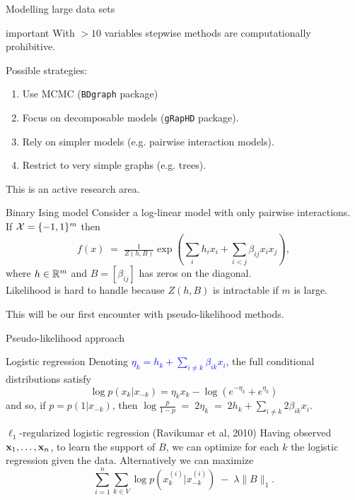 \documentclass[11pt,handout,aspectratio=169,dvipsnames]{beamer}
\begin{document}
\begin{frame}{Modelling large data sets}
		\begin{beamercolorbox}[wd=\paperwidth,sep=3pt]{important}
With $>10$ variables stepwise methods are computationally prohibitive. 
	\end{beamercolorbox}
	\bigskip
	
Possible strategies:\\[.3cm]
\begin{enumerate}
	\item Use MCMC (\texttt{BDgraph} package)
	\item Focus on \alert{decomposable models} (\texttt{gRapHD} package).\\[.3cm]
	\item Rely on simpler models (e.g. pairwise interaction models). \\[.3cm]
	\item Restrict to very simple graphs (e.g. trees).
\end{enumerate}
\bigskip

\alert{This is an active research area.}
\end{frame}



\begin{frame}{Binary Ising model}
	Consider a log-linear model with only pairwise interactions.\\[.3cm]
	If ${\cal X}=\{-1,1\}^m$ then $$f(x)\;=\;\tfrac{1}{Z(h,B)}\exp\left(\sum_i h_i x_i+\sum_{i<j}\beta_{ij}x_i x_j \right),$$
	where $h\in \mathbb R^m$ and $B=[\beta_{ij}]$ has zeros on the diagonal.\\[.3cm]
	Likelihood is hard to handle because $Z(h,B)$ is intractable if $m$ is large.\\
	\bigskip
	
	This will be our first encounter with pseudo-likelihood methods.
\end{frame}


\begin{frame}{Pseudo-likelihood approach}
\begin{block}{Logistic regression}
Denoting \textcolor{blue}{$\eta_k=h_k+\sum_{i\neq k}\beta_{ik}x_i$}, the full conditional distributions satisfy
	$$
	\log p(x_k|x_{-k})=\eta_k x_k-\log(e^{-\eta_k}+e^{\eta_k })
	$$ 
	and so, if $p= p(1|x_{-k})$, then \;\;\;\;\;
	$
	\log \frac{p}{1-p}\;=\;2\eta_k\;=\;2h_k+\sum_{i\neq k}2\beta_{ik}x_i.
	$
\end{block}
\begin{alertblock}{$\ell_1$-regularized logistic regression (Ravikumar et al, 2010)}
	Having observed $\mathbf{x}_1,\ldots,\mathbf{x}_n$, to learn the support of $B$, we can optimize for each $k$ the logistic regression given the data. Alternatively we can maximize
	$$
	\sum_{i=1}^n \sum_{k\in V} \log p(x_k^{(i)}|x_{-k}^{(i)})\;-\;\lambda \|B\|_1.
	$$
\end{alertblock}
\end{frame}
\end{document}
